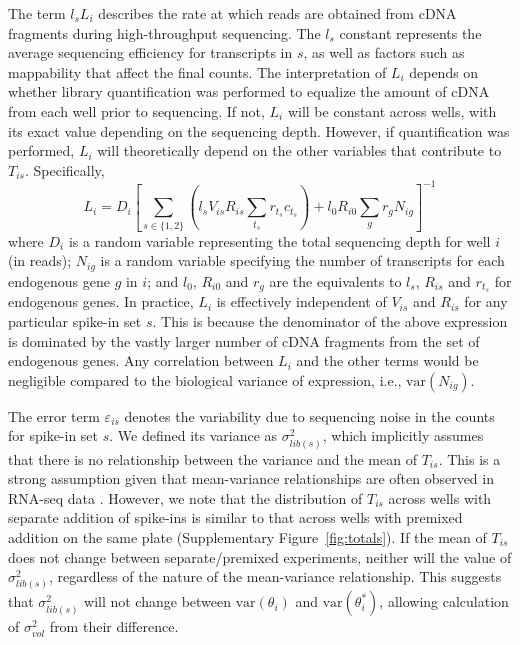\documentclass{article}
\newcommand\variance{\mbox{var}}
\begin{document}
The term $l_s L_i$ describes the rate at which reads are obtained from cDNA fragments during high-throughput sequencing.
The $l_s$ constant represents the average sequencing efficiency for transcripts in $s$, as well as factors such as mappability that affect the final counts.
The interpretation of $L_i$ depends on whether library quantification was performed to equalize the amount of cDNA from each well prior to sequencing.
If not, $L_i$ will be constant across wells, with its exact value depending on the sequencing depth.
However, if quantification was performed, $L_i$ will theoretically depend on the other variables that contribute to $T_{is}$.
Specifically,
\[
    L_i = D_i \left[ \sum_{s \in \{1, 2\}} \left( l_s V_{is} R_{is} \sum_{t_s} r_{t_s} c_{t_s} \right) + l_0 R_{i0} \sum_g r_g N_{ig} \right]^{-1}
\]
where $D_i$ is a random variable representing the total sequencing depth for well $i$ (in reads);
$N_{ig}$ is a random variable specifying the number of transcripts for each endogenous gene $g$ in $i$;
and $l_0$, $R_{i0}$ and $r_g$ are the equivalents to $l_s$, $R_{is}$ and $r_{t_s}$ for endogenous genes.
In practice, $L_i$ is effectively independent of $V_{is}$ and $R_{is}$ for any particular spike-in set $s$.
This is because the denominator of the above expression is dominated by the vastly larger number of cDNA fragments from the set of endogenous genes.
Any correlation between $L_i$ and the other terms would be negligible compared to the biological variance of expression, i.e., $\variance{(N_{ig})}$.

The error term $\varepsilon_{is}$ denotes the variability due to sequencing noise in the counts for spike-in set $s$.
We defined its variance as $\sigma^2_{lib(s)}$, which implicitly assumes that there is no relationship between the variance and the mean of $T_{is}$.
This is a strong assumption given that mean-variance relationships are often observed in RNA-seq data \citep{mccarthy2012differential,law2014voom}.
However, we note that the distribution of $T_{is}$ across wells with separate addition of spike-ins is similar to that across wells with premixed addition on the same plate (Supplementary Figure~\ref{fig:totals}).
If the mean of $T_{is}$ does not change between separate/premixed experiments, neither will the value of $\sigma^2_{lib(s)}$, regardless of the nature of the mean-variance relationship. 
This suggests that $\sigma^2_{lib(s)}$ will not change between $\variance(\theta_i)$ and $\variance(\theta^*_i)$, allowing calculation of $\sigma^2_{vol}$ from their difference.
\end{document}
